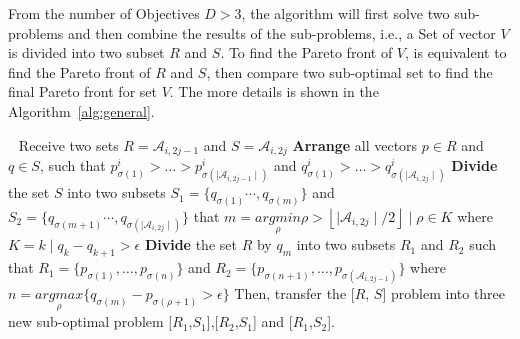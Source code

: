 From the number of Objectives $D>3$, the algorithm will first solve two sub-problems and then combine the results of the sub-problems, i.e., a Set of vector $V$ is divided into two subset $R$ and $S$. To find the Pareto front of $V$, is equivalent to find the Pareto front of $R$ and $S$, then compare two sub-optimal set to find the final Pareto front for set $V$. The more details is shown in the Algorithm~\ref{alg:general}.

\begin{algo}
\label{alg:suboptimal}
\begin{algorithmic}
\STATE	$\ \ $
\REQUIRE	Receive two sets $R=\mathscr{A}_{i,2j-1}$ and $S=\mathscr{A}_{i,2j}$
\STATE		\textbf{Arrange} all vectors $p\in R$ and $q\in S$, such that $p_{\sigma(1)}^i>\dots>p_{\sigma(\mid\mathscr{A}_{i,2j-1}\mid)}^i$ and $q_{\sigma(1)}^i>\dots>q_{\sigma(\mid\mathscr{A}_{i,2j}\mid)}^i$
\STATE \textbf{Divide} the set $S$ into two subsets $S_1 = \{q_{\sigma(1)}\cdots,q_{\sigma(m)}\}$ and $S_2 = \{q_{\sigma(m+1)}\cdots,q_{\sigma(\mid\mathscr{A}_{i,2j}\mid)}\}$ that $m =\underset{\rho}{argmin}{\rho>\left\lfloor \mid\mathscr{A}_{i,2j}\mid /2\right\rfloor\mid \rho\in K}$ where $K=k\mid q_k-q_{k+1}>\epsilon$
\STATE 	\textbf{Divide} the set $R$ by $q_m$ into two subsets $R_1$ and $R_2$ such that $R_1 = \{p_{\sigma(1)},\dots, p_{\sigma(n)}\}$ and $R_2 = \{p_{\sigma(n+1)},\dots,p_{\sigma(\mathscr{A}_{i,2j-1})}\}$ where $n = \underset{\rho}{argmax}\{q_{\sigma(m)}-p_{\sigma(\rho+1)}>\epsilon\}$
\STATE	Then, transfer the [$R$, $S$] problem into three new sub-optimal problem [$R_1$,$S_1$],[$R_2$,$S_1$] and [$R_1$,$S_2$]. 
\end{algorithmic}
\end{algo}


